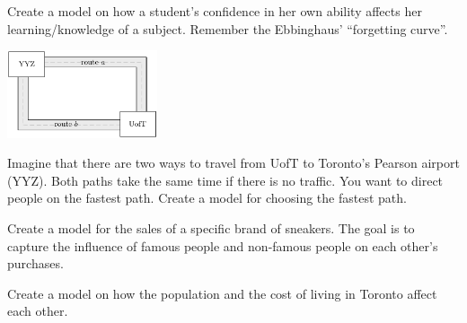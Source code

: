 \begin{exercises}
\begin{problist}
	\prob Create a model on how a student's confidence in her own ability affects her learning/knowledge of a subject. Remember the Ebbinghaus' ``forgetting curve''.

	\begin{center}
		\includegraphics*[width=125pt]{images/module15-UofT2YYZ.pdf}	
	\end{center}

	\prob Imagine that there are two ways to travel from UofT to Toronto's Pearson airport (YYZ). Both paths take the same time if there is no traffic. You want to direct people on the fastest path. Create a model for choosing the fastest path.
	
	
	\prob Create a model for the sales of a specific brand of sneakers. The goal is to capture the influence of famous people and non-famous people on each other's purchases.
	
	\prob Create a model on how the population and the cost of living in Toronto affect each other.
	
	
	\end{problist}
\end{exercises}
